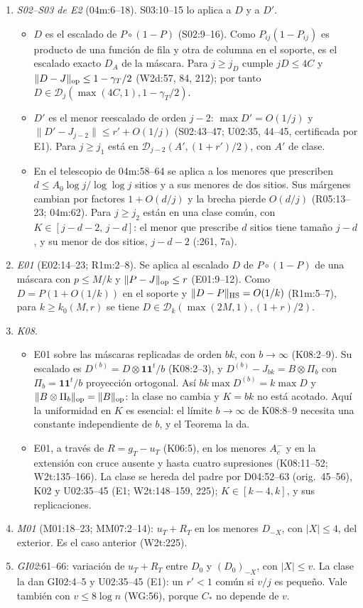 \begin{enumerate}
\item \emph{S02--S03 de E2} (04m:6--18). S03:10--15 lo aplica a $D$ y a $D'$.
  \begin{itemize}
  \item $D$ es el escalado de $P\circ(1-P)$ (S02:9--16). Como $P_{ij}(1-P_{ij})$ es producto de una
  función de fila y otra de columna en el soporte, es el escalado exacto $D_A$ de la máscara. Para
  $j\ge j_D$ cumple $jD\le4C$ y $\|D-J\|_{\rm op}\le1-\gamma_T/2$ (W2d:57, 84, 212); por tanto
  $D\in\mathcal D_j(\max(4C,1),1-\gamma_T/2)$.
  \item $D'$ es el menor reescalado de orden $j-2$: $\max D'=O(1/j)$ y $\|D'-J_{j-2}\|\le r'+O(1/j)$
  (S02:43--47; U02:35, 44--45, certificada por E1). Para $j\ge j_1$ está en
  $\mathcal D_{j-2}(A',(1+r')/2)$, con $A'$ de clase.
  \item En el telescopio de 04m:58--64 se aplica a los menores que prescriben
  $d\le A_0\log j/\log\log j$ sitios y a sus menores de dos sitios. Sus márgenes cambian por factores
  $1+O(d/j)$ y la brecha pierde $O(d/j)$ (R05:13--23; 04m:62). Para $j\ge j_2$ están en una clase
  común, con $K\in[j-d-2,\,j-d]$: el menor que prescribe $d$ sitios tiene tamaño $j-d$, y su menor
  de dos sitios, $j-d-2$ (:261, 7a).
  \end{itemize}
\item \emph{E01} (E02:14--23; R1m:2--8). Se aplica al escalado $D$ de $P\circ(1-P)$ de una máscara
  con $p\le M/k$ y $\|P-J\|_{\rm op}\le r$ (E01:9--12). Como $D=P(1+O(1/k))$ en el soporte y
  $\|D-P\|_{\rm HS}=O(1/k)$ (R1m:5--7), para $k\ge k_0(M,r)$ se tiene
  $D\in\mathcal D_k(\max(2M,1),(1+r)/2)$.
\item \emph{K08}.
  \begin{itemize}
  \item E01 sobre las máscaras replicadas de orden $bk$, con $b\to\infty$ (K08:2--9). Su escalado es
  $D^{(b)}=D\otimes\mathbf1\mathbf1^t/b$ (K08:2--3), y $D^{(b)}-J_{bk}=B\otimes\Pi_b$ con
  $\Pi_b=\mathbf1\mathbf1^t/b$ proyección ortogonal. Así $bk\max D^{(b)}=k\max D$ y
  $\|B\otimes\Pi_b\|_{\rm op}=\|B\|_{\rm op}$: la clase no cambia y $K=bk$ no está acotado. Aquí la
  uniformidad en $K$ es esencial: el límite $b\to\infty$ de K08:8--9 necesita una constante
  independiente de $b$, y el Teorema la da.
  \item E01, a través de $R=g_T-u_T$ (K06:5), en los menores $A^-_c$ y en la extensión con cruce
  ausente y hasta cuatro supresiones (K08:11--52; W2t:135--166). La clase se hereda del padre
  por D04:52--63 (orig.~45--56), K02 y U02:35--45 (E1; W2t:148--159, 225); $K\in[k-4,k]$, y sus
  replicaciones.
  \end{itemize}
\item \emph{M01} (M01:18--23; MM07:2--14): $u_T+R_T$ en los menores $D_{-X}$, con $|X|\le4$, del
  exterior. Es el caso anterior (W2t:225).
\item \emph{GI02}:61--66: variación de $u_T+R_T$ entre $D_0$ y $(D_0)_{-X}$, con $|X|\le v$. La clase
  la dan GI02:4--5 y U02:35--45 (E1): un $r'<1$ común si $v/j$ es pequeño. Vale también con
  $v\le8\log n$ (WG:56), porque $C_*$ no depende de $v$.
\end{enumerate}
